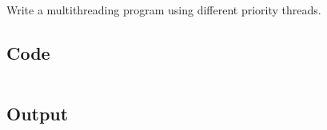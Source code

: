 \documentclass[../main.tex]{subfiles}
\begin{document}
Write a multithreading program using different priority threads.

\subsection{Code}
\inputminted[frame=lines, breaklines, breakanywhere, numberblanklines=false]{java}{./programs/prog21/Threading.java}

\subsection{Output}
\end{document}
